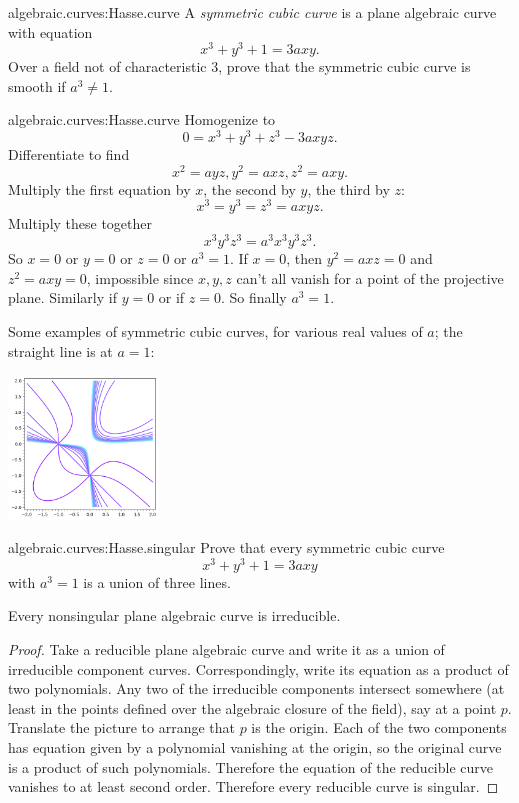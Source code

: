 \begin{problem}{algebraic.curves:Hasse.curve}
A \emph{symmetric cubic curve} is a plane algebraic curve with equation
\[
x^3+y^3+1=3axy.
\]
Over a field not of characteristic \(3\), prove that the symmetric cubic curve is smooth if \(a^3\ne 1\).
\end{problem}
\begin{answer}{algebraic.curves:Hasse.curve}
Homogenize to
\[
0=x^3+y^3+z^3-3axyz.
\]
Differentiate to find
\[
x^2=ayz, y^2=axz, z^2=axy.
\]
Multiply the first equation by \(x\), the second by \(y\), the third by \(z\): 
\[
x^3=y^3=z^3=axyz.
\]
Multiply these together
\[
x^3y^3z^3=a^3x^3y^3z^3.
\]
So \(x=0\) or \(y=0\) or \(z=0\) or \(a^3=1\).
If \(x=0\), then \(y^2=axz=0\) and \(z^2=axy=0\), impossible since \(x,y,z\) can't all vanish for a point of the projective plane.
Similarly if \(y=0\) or if \(z=0\).
So finally \(a^3=1\).
\end{answer}
\begin{example}
Some examples of symmetric cubic curves, for various real values of \(a\); the straight line is at \(a=1\):
\begin{center}
\includegraphics[width=4cm]{symmetric-cubics.png}
\end{center}
\end{example}
\begin{problem*}{algebraic.curves:Hasse.singular}
Prove that every symmetric cubic curve 
\[
x^3+y^3+1=3axy
\]
with \(a^3=1\) is a union of three lines.
\end{problem*}
\begin{theorem}
Every nonsingular plane algebraic curve is irreducible.
\end{theorem}
\begin{proof}
Take a reducible plane algebraic curve and write it as a union of irreducible component curves.
Correspondingly, write its equation as a product of two polynomials.
Any two of the irreducible components intersect somewhere (at least in the points defined over the algebraic closure of the field), say at a point \(p\).
Translate the picture to arrange that \(p\) is the origin.
Each of the two components has equation given by a polynomial vanishing at the origin, so the original curve is a product of such polynomials.
Therefore the equation of the reducible curve vanishes to at least second order.
Therefore every reducible curve is singular.
\end{proof}
